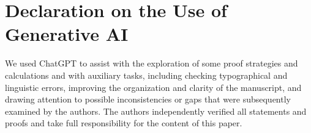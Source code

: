 \documentclass[preprint,11pt,numbers]{elsarticle-arxiv}
\numberwithin{equation}{section}
\theoremstyle{definition}
\begin{document}
\section*{Declaration on the Use of Generative AI}
We used ChatGPT to assist with the exploration of some proof strategies
and calculations and with auxiliary tasks, including checking typographical
and linguistic errors, improving the organization and clarity of the manuscript,
and drawing attention to possible inconsistencies or gaps that were subsequently
examined by the authors. The authors independently verified all statements and
proofs and take full responsibility for the content of this paper.

\begingroup
\small
\setlength{\bibsep}{3pt plus .3pt minus .3pt}
{}

\endgroup
\end{document}
